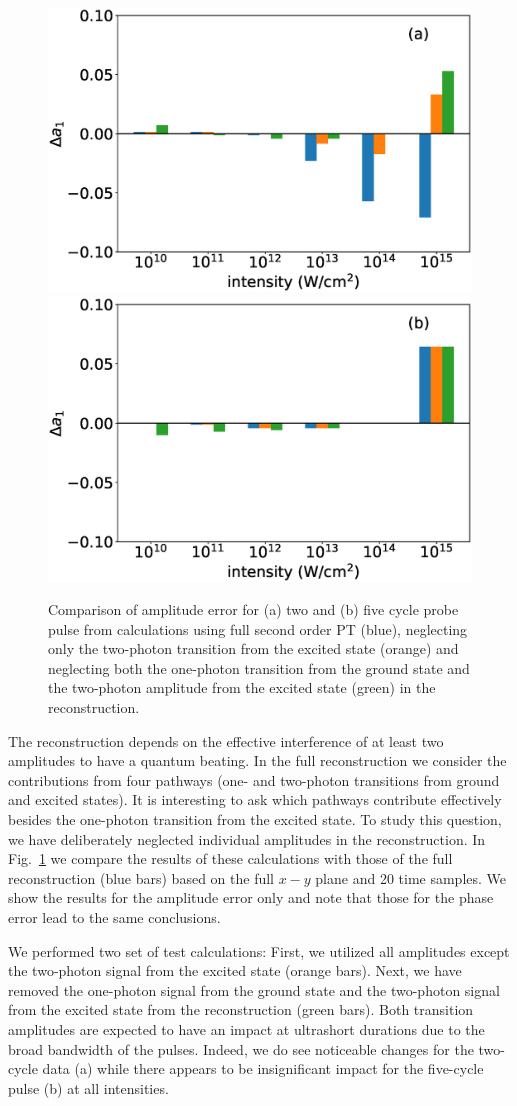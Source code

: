 \begin{figure}[!ht]
\centering
\includegraphics[width=0.49\linewidth]{figs/Photo_ionization/superpositions/Venzke_new_fig_5a.eps}
\includegraphics[width=0.49\linewidth]{figs/Photo_ionization/superpositions/Venzke_new_fig_5b.eps}
\caption{Comparison of amplitude error for (a) two  and (b) five cycle probe pulse from calculations using full second order PT (blue), neglecting only the two-photon transition from the excited state (orange) and neglecting both the one-photon transition from the ground state and the two-photon amplitude from the excited state (green) in the reconstruction. 
} 
  \label{fig:pathways}
\end{figure}

The reconstruction depends on the effective interference of at least two amplitudes to have a quantum beating. In the full reconstruction we consider the contributions from four pathways (one- and two-photon transitions from ground and excited states). It is interesting to ask which pathways contribute effectively besides the one-photon transition from the excited state. To study this question, we have deliberately neglected individual amplitudes in the reconstruction. In Fig.\ \ref{fig:pathways} we compare the results of these calculations with those of the full reconstruction (blue bars) based on the full $x-y$ plane and 20 time samples. We show the results for the amplitude error only and note that those for the phase error lead to the same conclusions.

We performed two set of test calculations: First, we utilized all amplitudes except the two-photon signal from the excited state (orange bars). Next, we have removed the one-photon signal from the ground state and the two-photon signal from the excited state from the reconstruction (green bars). Both transition amplitudes are expected to have an impact at ultrashort durations due to the broad bandwidth of the pulses. Indeed, we do see noticeable changes for the two-cycle data (a) while there appears to be insignificant impact for the five-cycle pulse (b) at all intensities.

